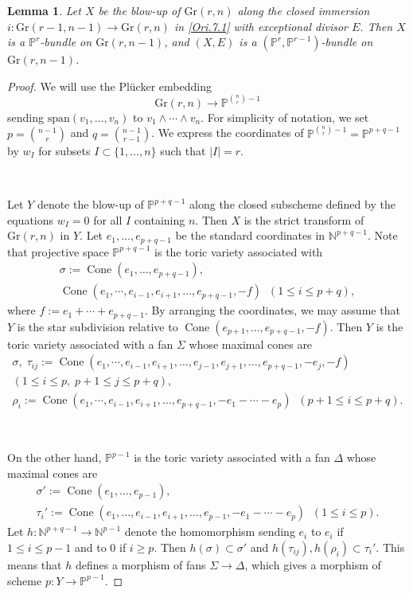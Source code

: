 \documentclass[11pt, a4paper]{amsart}
\newtheorem{lem}[thm]{Lemma}
\theoremstyle{definition}
\numberwithin{equation}{subsection}
\newcommand{\N}{\mathbb{N}}
\renewcommand{\P}{\mathbb{P}}
\newcommand{\Cone}{\operatorname{Cone}}
\newcommand{\Gr}{{\mathrm{Gr}}}
\begin{document}
\begin{lem}
\label{Ori.8}
Let $X$ be the blow-up of $\Gr(r,n)$ along the closed immersion $i\colon \Gr(r-1,n-1)\to \Gr(r,n)$ in 
\eqref{Ori.7.1} with exceptional divisor $E$.
Then $X$ is a $\P^r$-bundle on $\Gr(r,n-1)$, and $(X,E)$ is a $(\P^r,\P^{r-1})$-bundle on $\Gr(r,n-1)$.
\end{lem}
\begin{proof}
We will use the Pl\"ucker embedding
\[
\Gr(r,n)\to \P^{\binom{n}{r}-1}
\]
sending $\mathrm{span}(v_1,\ldots,v_n)$ to $v_1\wedge \cdots \wedge v_n$.
For simplicity of notation, we set $p=\binom{n-1}{r}$ and $q=\binom{n-1}{r-1}$.
We express the coordinates of $\P^{\binom{n}{r}-1}=\P^{p+q-1}$ by $w_I$ for subsets 
$I\subset \{1,\ldots,n\}$ such that $|I|=r$.

\

Let $Y$ denote the blow-up of $\P^{p+q-1}$ along the closed subscheme defined 
by the equations $w_I=0$ for all $I$ containing $n$.
Then $X$ is the strict transform of $\Gr(r,n)$ in $Y$.
Let $e_1,\ldots,e_{p+q-1}$ be the standard coordinates in $\N^{p+q-1}$.
Note that projective space $\P^{p+q-1}$ is the toric variety associated with
\begin{gather*}
\sigma:=\Cone(e_1,\ldots,e_{p+q-1}),
\\
\Cone(e_1,\cdots,e_{i-1},e_{i+1},\ldots,e_{p+q-1},-f)\;\; (1\leq i\leq p+q),
\end{gather*}
where $f:=e_1+\cdots+e_{p+q-1}$.
By arranging the coordinates,
we may assume that $Y$ is the star subdivision relative to 
$\Cone(e_{p+1},\ldots,e_{p+q-1},-f)$.
Then $Y$ is the toric variety associated with a fan $\Sigma$ whose maximal cones are
\begin{gather*}
\sigma,
\;
\tau_{ij}:=\Cone(e_1,\cdots,e_{i-1},e_{i+1},\ldots,e_{j-1},e_{j+1},\ldots,e_{p+q-1},-e_j,-f)
\\
(1\leq i\leq p,\; p+1\leq j\leq p+q),
\\
\rho_i:=\Cone(e_1,\cdots,e_{i-1},e_{i+1},\ldots,e_{p+q-1},-e_1-\cdots-e_p)
\;\;
(p+1\leq i\leq p+q).
\end{gather*}

\

On the other hand, $\P^{p-1}$ is the toric variety associated with a fan $\Delta$ whose maximal cones are
\begin{gather*}
\sigma':=\Cone(e_1,\ldots,e_{p-1}),
\\
\tau_{i}':=\Cone(e_1,\ldots,e_{i-1},e_{i+1},\ldots,e_{p-1},-e_1-\cdots -e_p)\;\;(1\leq i\leq p).
\end{gather*}
Let $h\colon \N^{p+q-1}\to \N^{p-1}$ denote the homomorphism sending $e_i$ to $e_i$ if 
$1\leq i\leq p-1$ and to $0$ if $i\geq p$.
Then $h(\sigma)\subset \sigma'$ and $h(\tau_{ij}),h(\rho_i)\subset \tau_i'$.
This means that $h$ defines a morphism of fans $\Sigma\to \Delta$, 
which gives a morphism of scheme $p\colon Y\to \P^{p-1}$.


\end{proof}
\end{document}
